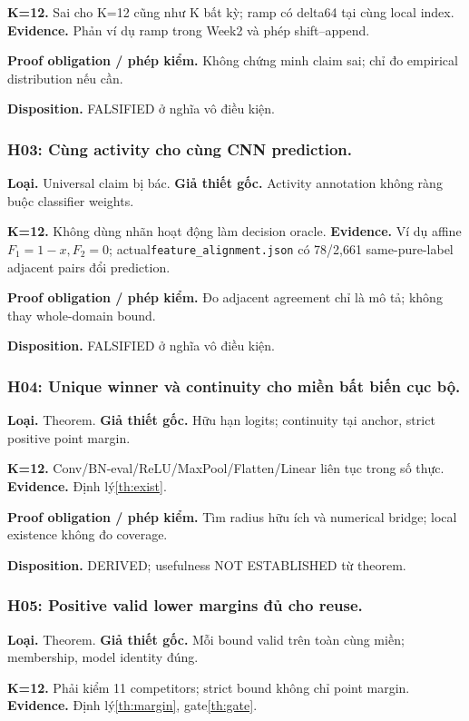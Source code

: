 \documentclass[11pt,a4paper]{article}
\newcommand{\code}[1]{{\small\ttfamily\nolinkurl{#1}}}
\theoremstyle{remark}
\begin{document}
\textbf{K=12.} Sai cho K=12 cũng như K bất kỳ; ramp có delta64 tại cùng local index. \textbf{Evidence.} Phản ví dụ ramp trong Week2 và phép shift--append.

\textbf{Proof obligation / phép kiểm.} Không chứng minh claim sai; chỉ đo empirical distribution nếu cần.

\textbf{Disposition.} FALSIFIED ở nghĩa vô điều kiện.

\subsubsection*{H03: Cùng activity cho cùng CNN prediction.}
\textbf{Loại.} Universal claim bị bác. \textbf{Giả thiết gốc.} Activity annotation không ràng buộc classifier weights.

\textbf{K=12.} Không dùng nhãn hoạt động làm decision oracle. \textbf{Evidence.} Ví dụ affine $F_1=1-x,F_2=0$; actual\code{feature_alignment.json} có 78/2,661 same-pure-label adjacent pairs đổi prediction.

\textbf{Proof obligation / phép kiểm.} Đo adjacent agreement chỉ là mô tả; không thay whole-domain bound.

\textbf{Disposition.} FALSIFIED ở nghĩa vô điều kiện.

\subsubsection*{H04: Unique winner và continuity cho miền bất biến cục bộ.}
\textbf{Loại.} Theorem. \textbf{Giả thiết gốc.} Hữu hạn logits; continuity tại anchor, strict positive point margin.

\textbf{K=12.} Conv/BN-eval/ReLU/MaxPool/Flatten/Linear liên tục trong số thực. \textbf{Evidence.} Định lý\ref{th:exist}.

\textbf{Proof obligation / phép kiểm.} Tìm radius hữu ích và numerical bridge; local existence không đo coverage.

\textbf{Disposition.} DERIVED; usefulness NOT ESTABLISHED từ theorem.

\subsubsection*{H05: Positive valid lower margins đủ cho reuse.}
\textbf{Loại.} Theorem. \textbf{Giả thiết gốc.} Mỗi bound valid trên toàn cùng miền; membership, model identity đúng.

\textbf{K=12.} Phải kiểm 11 competitors; strict bound không chỉ point margin. \textbf{Evidence.} Định lý\ref{th:margin}, gate\ref{th:gate}.
\end{document}
